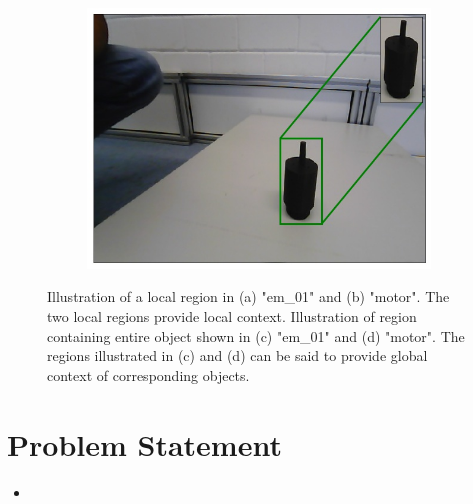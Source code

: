 \begin{figure}
\begin{subfigure}{.4\textwidth}
			\caption{}
			\label{Fig:em01g}
		\end{subfigure}
		\begin{subfigure}{.4\textwidth}
			\centering
			\includegraphics[width=.9\linewidth]{images/motor_context_g}
			\caption{}
			\label{Fig:motorg}
		\end{subfigure}
		\caption{Illustration of a local region in (a) "em\_01" and (b) "motor". The two local regions provide local context. Illustration of region containing entire object shown in (c) "em\_01" and (d) "motor". The regions illustrated in (c) and (d) can be said to provide global context of corresponding objects.}
		\label{Fig:context}
	\end{figure}

\section{Problem Statement}

	\begin{itemize}
		\item 
	\end{itemize}